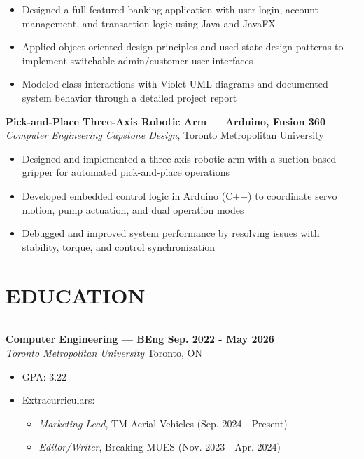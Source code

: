 \documentclass[12pt, letterpaper]{article}
\begin{document}
		\begin{itemize}
			\item Designed a full-featured banking application with user login, account management, and transaction logic using Java and JavaFX
			\item Applied object-oriented design principles and used state design patterns to implement switchable admin/customer user interfaces
			\item Modeled class interactions with Violet UML diagrams and documented system behavior through a detailed project report
		\end{itemize}
		\textbf{Pick-and-Place Three-Axis Robotic Arm --- Arduino, Fusion 360}\\
		\textit{Computer Engineering Capstone Design}, Toronto Metropolitan University
		\begin{itemize}
			\item Designed and implemented a three-axis robotic arm with a suction-based gripper for automated pick-and-place operations
			\item Developed embedded control logic in Arduino (C++) to coordinate servo motion, pump actuation, and dual operation modes
			\item Debugged and improved system performance by resolving issues with stability, torque, and control synchronization
		\end{itemize}
		
	\section*{EDUCATION}
		\noindent\rule{\textwidth}{0.5pt}
		\textbf{Computer Engineering --- BEng \hfill Sep. 2022 - May 2026}\\
		\textit{Toronto Metropolitan University} \hfill Toronto, ON
		\begin{itemize}
			\item GPA: 3.22
			\item Extracurriculars:
			\begin{itemize}
				\item \textit{Marketing Lead}, TM Aerial Vehicles (Sep. 2024 - Present)
				\item \textit{Editor/Writer}, Breaking MUES (Nov. 2023 - Apr. 2024)
			\end{itemize}
		\end{itemize}
		
\end{document}
